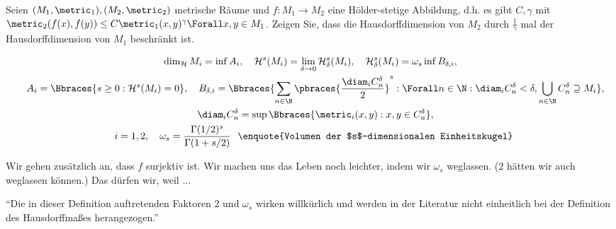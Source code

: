 
\begin{exercise}

Seien $(M_1, \metric_1),(M_2, \metric_2)$ metrische Räume und $f: M_1 \to M_2$ eine Hölder-stetige Abbildung, d.h. es gibt $C, \gamma$ mit $\metric_2(f(x), f(y)) \leq C \metric_1(x, y)^\gamma \Forall x, y \in M_1$.
Zeigen Sie, dass die Hausdorffdimension von $M_2$ durch $\frac{1}{\gamma}$ mal der Hausdorffdimension von $M_1$ beschränkt ist.

\end{exercise}


\begin{solution}

\begin{gather*}
    \dim_\mathcal{H} M_i
    =
    \inf A_i,
    \quad
    \mathcal{H}^s(M_i)
    =
    \lim_{\delta \to 0}
        \mathcal{H}_\delta^s(M_i),
    \quad
    \mathcal{H}_\delta^s(M_i)
    =
    \omega_s
    \inf B_{\delta, i}, \\
    \quad
    A_i
    =
    \Bbraces
    {
        s \geq 0:
        \mathcal{H}^s(M_i) = 0
    },
    \quad
    B_{\delta, i}
    =
    \Bbraces
    {
        \sum_{n \in \N}
            \pbraces
            {
                \frac{\diam_i C_n^\delta}{2}}^s:
                \Forall n \in \N:
                    \diam_i C_n^\delta < \delta,
                \bigcup_{n \in \N} C_n^\delta \supseteq M_i
    }, \\
    \quad
    \diam_i C_n^\delta
    =
    \sup
    \Bbraces
    {
        \metric_i(x, y):
        x, y \in C_n^\delta
    }, \\
    \quad i = 1, 2,
    \quad
    \omega_s
    =
    \frac
    {
        \Gamma(1/2)^s
    }{
        \Gamma(1 + s/2)
    }
    ~\text
    {
        \enquote{Volumen der $s$-dimensionalen Einheitskugel}
    }
\end{gather*}

Wir gehen zusätzlich an, dass $f$ surjektiv ist.
Wir machen uns das Leben noch leichter, indem wir $\omega_s$ weglassen.
($2$ hätten wir auch weglassen können.)
Das dürfen wir, weil ...

\begin{center}
    \enquote{Die in dieser Definition auftretenden Faktoren $2$ und $\omega_s$ wirken willkürlich und werden in der Literatur nicht einheitlich bei der Definition des Hausdorffmaßes herangezogen.}
\end{center}


\end{solution}
